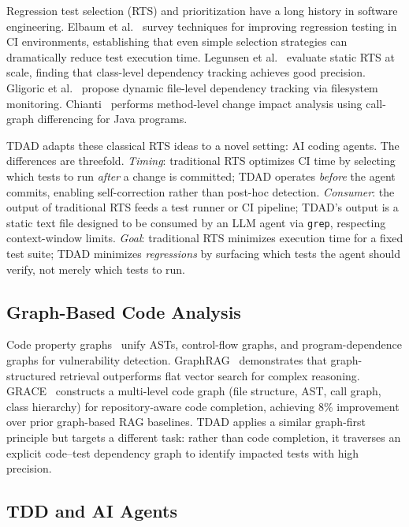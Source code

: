 \documentclass[sigconf,nonacm]{acmart}
\begin{document}
Regression test selection (RTS) and prioritization have a long history in
software engineering.  Elbaum et al.~\cite{elbaum2014techniques} survey
techniques for improving regression testing in CI environments, establishing
that even simple selection strategies can dramatically reduce test execution
time.  Legunsen et al.~\cite{legunsen2016extensive} evaluate static RTS at
scale, finding that class-level dependency tracking achieves good precision.
Gligoric et al.~\cite{gligoric2015practical} propose dynamic file-level
dependency tracking via filesystem monitoring.
Chianti~\cite{ren2004chianti} performs method-level change impact analysis
using call-graph differencing for Java programs.

\textsc{TDAD} adapts these classical RTS ideas to a novel setting: AI coding
agents.  The differences are threefold.
\emph{Timing}: traditional RTS optimizes CI time by selecting which tests to
run \emph{after} a change is committed; \textsc{TDAD} operates \emph{before}
the agent commits, enabling self-correction rather than post-hoc detection.
\emph{Consumer}: the output of traditional RTS feeds a test runner or CI
pipeline; \textsc{TDAD}'s output is a static text file designed to be consumed
by an LLM agent via \texttt{grep}, respecting context-window limits.
\emph{Goal}: traditional RTS minimizes execution time for a fixed test suite;
\textsc{TDAD} minimizes \emph{regressions} by surfacing which tests the agent
should verify, not merely which tests to run.

\subsection{Graph-Based Code Analysis}

Code property graphs~\cite{yamaguchi2014modeling} unify ASTs,
control-flow graphs, and program-dependence graphs for vulnerability
detection.  GraphRAG~\cite{edge2024graphrag} demonstrates that
graph-structured retrieval outperforms flat vector search for complex
reasoning.  GRACE~\cite{wang2025grace} constructs a multi-level code
graph (file structure, AST, call graph, class hierarchy) for
repository-aware code completion, achieving 8\% improvement over
prior graph-based RAG baselines.  \textsc{TDAD} applies a similar
graph-first principle but targets a different task: rather than
code completion, it traverses an explicit code--test dependency graph
to identify impacted tests with high precision.

\subsection{TDD and AI Agents}
\end{document}
